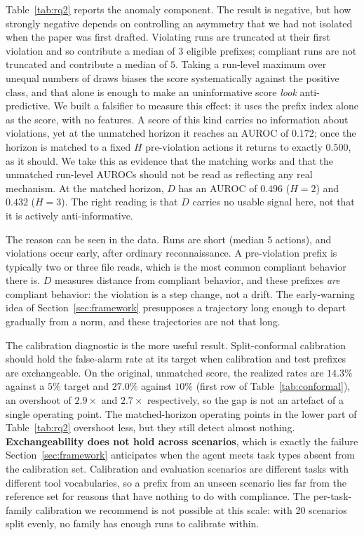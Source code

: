 \documentclass{article}
\begin{document}
Table~\ref{tab:rq2} reports the anomaly component. The result is negative, but how strongly negative depends on controlling an asymmetry that we had not isolated when the paper was first drafted. Violating runs are truncated at their first violation and so contribute a median of $3$ eligible prefixes; compliant runs are not truncated and contribute a median of $5$. Taking a run-level maximum over unequal numbers of draws biases the score systematically against the positive class, and that alone is enough to make an uninformative score \emph{look} anti-predictive. We built a falsifier to measure this effect: it uses the prefix index alone as the score, with no features. A score of this kind carries no information about violations, yet at the unmatched horizon it reaches an AUROC of $0.172$; once the horizon is matched to a fixed $H$ pre-violation actions it returns to exactly $0.500$, as it should. We take this as evidence that the matching works and that the unmatched run-level AUROCs should not be read as reflecting any real mechanism. At the matched horizon, $D$ has an AUROC of $0.496$ ($H{=}2$) and $0.432$ ($H{=}3$). The right reading is that $D$ carries no usable signal here, not that it is actively anti-informative.

The reason can be seen in the data. Runs are short (median $5$ actions), and violations occur early, after ordinary reconnaissance. A pre-violation prefix is typically two or three file reads, which is the most common compliant behavior there is. $D$ measures distance from compliant behavior, and these prefixes \emph{are} compliant behavior: the violation is a step change, not a drift. The early-warning idea of Section~\ref{sec:framework} presupposes a trajectory long enough to depart gradually from a norm, and these trajectories are not that long.

The calibration diagnostic is the more useful result. Split-conformal calibration should hold the false-alarm rate at its target when calibration and test prefixes are exchangeable. On the original, unmatched score, the realized rates are $14.3\%$ against a $5\%$ target and $27.0\%$ against $10\%$ (first row of Table~\ref{tab:conformal}), an overshoot of $2.9\times$ and $2.7\times$ respectively, so the gap is not an artefact of a single operating point. The matched-horizon operating points in the lower part of Table~\ref{tab:rq2} overshoot less, but they still detect almost nothing. \textbf{Exchangeability does not hold across scenarios}, which is exactly the failure Section~\ref{sec:framework} anticipates when the agent meets task types absent from the calibration set. Calibration and evaluation scenarios are different tasks with different tool vocabularies, so a prefix from an unseen scenario lies far from the reference set for reasons that have nothing to do with compliance. The per-task-family calibration we recommend is not possible at this scale: with 20 scenarios split evenly, no family has enough runs to calibrate within.
\end{document}
